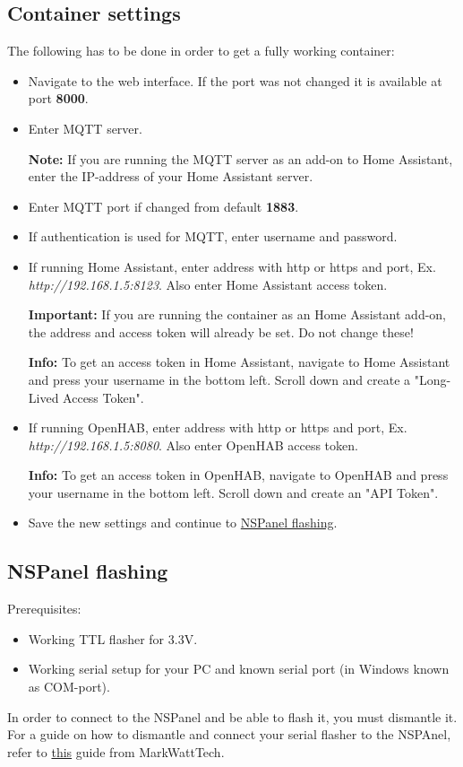 \documentclass[10pt]{article}
\newcommand{\info}[1]{\begin{infoBox} \textbf{Info:} #1 \end{infoBox}}
\newcommand{\note}[1]{\begin{noteBox} \textbf{Note:} #1 \end{noteBox}}
\newcommand{\important}[1]{\begin{importantBox} \textbf{Important:} #1 \end{importantBox}}
\begin{document}
    \subsection{Container settings}
    The following has to be done in order to get a fully working container:
    \begin{itemize}
      \item Navigate to the web interface. If the port was not changed it is available at port \textbf{8000}.
      \item Enter MQTT server.
        \note{If you are running the MQTT server as an add-on to Home Assistant, enter the IP-address of your Home Assistant server.}
      \item Enter MQTT port if changed from default \textbf{1883}.
      \item If authentication is used for MQTT, enter username and password.
      \item If running Home Assistant, enter address with http or https and port, Ex. \textit{http://192.168.1.5:8123}. Also enter Home Assistant access token.
      \important{If you are running the container as an Home Assistant add-on, the address and access token will already be set. Do not change these!}
      \info{To get an access token in Home Assistant, navigate to Home Assistant and press your username in the bottom left. Scroll down and create a "Long-Lived Access Token".}
      \item If running OpenHAB, enter address with http or https and port, Ex. \textit{http://192.168.1.5:8080}. Also enter OpenHAB access token.
      \info{To get an access token in OpenHAB, navigate to OpenHAB and press your username in the bottom left. Scroll down and create an "API Token".}
    \item Save the new settings and continue to \hyperref[sec:nspanel_flashing]{NSPanel flashing}.
    \end{itemize}

    \subsection{NSPanel flashing}
    \label{sec:nspanel_flashing}
    Prerequisites:
    \begin{itemize}
      \item Working TTL flasher for 3.3V.
      \item Working serial setup for your PC and known serial port (in Windows known as COM-port).
    \end{itemize}
    In order to connect to the NSPanel and be able to flash it, you must dismantle it. For a guide on how to dismantle and connect your serial flasher to the NSPAnel, refer to \href{https://www.youtube.com/watch?v=p-AK4o5jOSI}{this} guide from MarkWattTech.
\end{document}
